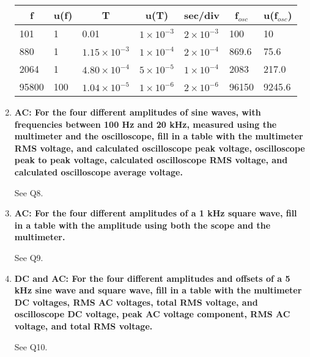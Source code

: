 \begin{enumerate}[resume]
\begin{table}[ht]
\center
\begin{tabular}{|l|l|l|l|l|l|l|}
\hline
\multicolumn{1}{|c|}{f} & \multicolumn{1}{c|}{u(f)} & \multicolumn{1}{c|}{T} & \multicolumn{1}{c|}{u(T)} & \multicolumn{1}{c|}{sec/div} & \multicolumn{1}{c|}{f$_{osc}$} & \multicolumn{1}{c|}{u(f$_{osc}$)} \\ \hline
101                     & 1                         & 0.01                   & $1\times10^{-3}$          & $2\times10^{-3}$             & 100                            & 10                                \\ \hline
880                     & 1                         & $1.15\times10^{-3}$    & $1\times10^{-4}$          & $2\times10^{-4}$             & 869.6                          & 75.6                              \\ \hline
2064                    & 1                         & $4.80\times10^{-4}$    & $5\times10^{-5}$          & $1\times10^{-4}$             & 2083                           & 217.0                             \\ \hline
95800                   & 100                       & $1.04\times10^{-5}$    & $1\times10^{-6}$          & $2\times10^{-6}$             & 96150                          & 9245.6                            \\ \hline
\end{tabular}
\label{tab:accg10}
\end{table}


\item {\bf AC: For the four different amplitudes of sine waves, with frequencies between 100 Hz and 20 kHz, measured using the multimeter and the oscilloscope, fill in a table with the multimeter RMS voltage, and calculated oscilloscope peak voltage, oscilloscope peak to peak voltage, calculated oscilloscope RMS voltage, and calculated oscilloscope average voltage.}\newline

See Q8.

\item {\bf AC: For the four different amplitudes of a 1 kHz square wave, fill in a table with the amplitude using both the scope and the multimeter.}\newline

See Q9.

\item {\bf DC and AC: For the four different amplitudes and offsets of a 5 kHz sine wave and square wave, fill in a table with the multimeter DC voltages, RMS AC voltages, total RMS voltage, and oscilloscope DC voltage, peak AC voltage component, RMS AC voltage, and total RMS voltage.}\newline

See Q10.

\end{enumerate}


